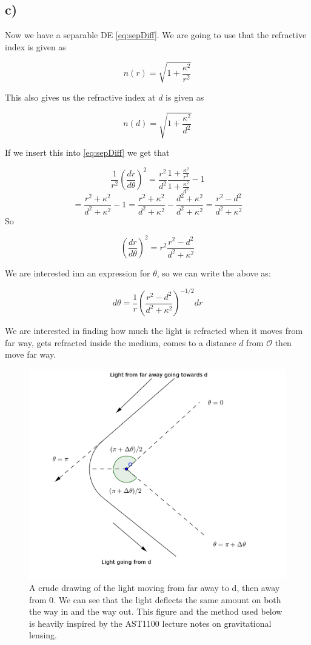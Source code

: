 \documentclass[a4paper,norsk, 10pt]{article}
\begin{document}
\subsection*{c)}

Now we have a separable DE \ref{eq:sepDiff}. We are going to use that the refractive index is given as 

\begin{equation}
n(r) = \sqrt{1 + \frac{\kappa^2}{r^2}}
\label{eq:refIndex}
\end{equation}

This also gives us the refractive index at $d$ is given as

$$
n(d) = \sqrt{1 + \frac{\kappa^2}{d^2}}
$$

If we insert this into \ref{eq:sepDiff} we get that 

$$
\frac{1}{r^2}\left(\frac{dr}{d\theta}\right)^2 = \frac{r^2}{d^2}\frac{1 + \frac{\kappa^2}{r^2}}{1 + \frac{\kappa^2}{d^2}} -1
$$
$$
= \frac{r^2 + \kappa^2}{d^2+\kappa^2} - 1 = \frac{r^2 + \kappa^2}{d^2+\kappa^2} - \frac{d^2+\kappa^2}{d^2+\kappa^2} = \frac{r^2 -d^2}{d^2 +\kappa^2}
$$
So

$$
\left(\frac{dr}{d\theta}\right)^2 = r^2\frac{r^2 -d^2}{d^2 +\kappa^2}
$$


We are interested inn an expression for $\theta$, so we can write the above as:

\begin{equation}
d\theta = \frac{1}{r}\left(\frac{r^2 -d^2}{d^2 +\kappa^2}\right)^{-1/2}dr
\end{equation}


We are interested in finding how much the light is refracted when it moves from far way, gets refracted inside the medium, comes to a distance $d$ from $\mathcal{O}$ then move far way.

\begin{figure}[H]
\centering
\includegraphics[scale=0.4]{3c.png}
\caption{A crude drawing of the light moving from far away to d, then away from $\mathcal{0}$. We can see that the light deflects the same amount on both the way in and the way out. This figure and the method used below is heavily inspired by the AST1100 lecture notes on gravitational lensing.}
\end{figure}
\end{document}
